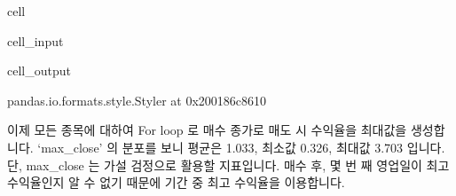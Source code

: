 \documentclass[letterpaper,10pt,english]{jupyterBook}
\begin{document}
\begin{sphinxuseclass}{cell}\begin{sphinxVerbatimInput}

\begin{sphinxuseclass}{cell_input}
\begin{sphinxVerbatim}[commandchars=\\\{\}]
\end{sphinxVerbatim}

\end{sphinxuseclass}\end{sphinxVerbatimInput}
\begin{sphinxVerbatimOutput}

\begin{sphinxuseclass}{cell_output}
\begin{sphinxVerbatim}[commandchars=\\\{\}]
\PYGZlt{}pandas.io.formats.style.Styler at 0x200186c8610\PYGZgt{}
\end{sphinxVerbatim}

\end{sphinxuseclass}\end{sphinxVerbatimOutput}

\end{sphinxuseclass}
\sphinxAtStartPar
이제 모든 종목에 대하여 For loop 로 매수 종가로 매도 시 수익율을 최대값을 생성합니다. ‘max\_close’ 의 분포를 보니 평균은 1.033, 최소값 0.326, 최대값 3.703 입니다. 단, max\_close 는 가설 검정으로 활용할 지표입니다. 매수 후, 몇 번 째 영업일이 최고 수익율인지 알 수 없기 때문에 기간 중 최고 수익율을 이용합니다.
\end{document}
